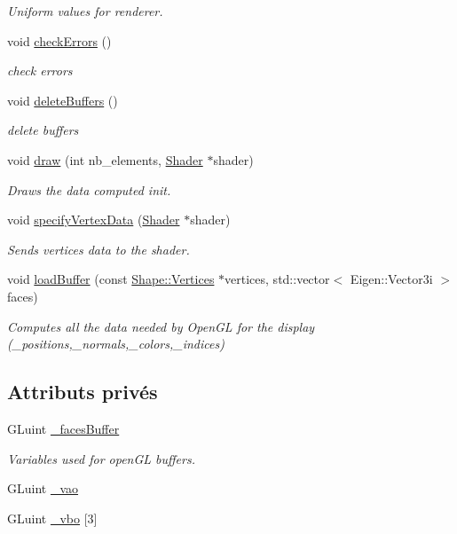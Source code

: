 \begin{DoxyCompactItemize}
\begin{DoxyCompactList}\small\item\em Uniform values for renderer. \end{DoxyCompactList}\item 
void \hyperlink{class_rendering___open_g_l_a9621079239b6b621dfc8f9c4e93bdd7a}{check\+Errors} ()
\begin{DoxyCompactList}\small\item\em check errors \end{DoxyCompactList}\item 
void \hyperlink{class_rendering___open_g_l_aab5b195bb52751243f4944417f9ae7d5}{delete\+Buffers} ()
\begin{DoxyCompactList}\small\item\em delete buffers \end{DoxyCompactList}\item 
void \hyperlink{class_rendering___open_g_l_a94abb636d4264637628e4b9b97c087d2}{draw} (int nb\+\_\+elements, \hyperlink{class_shader}{Shader} $\ast$shader)
\begin{DoxyCompactList}\small\item\em Draws the data computed init. \end{DoxyCompactList}\item 
void \hyperlink{class_rendering___open_g_l_a8ad1a3e698d694782f4174d94b745cd5}{specify\+Vertex\+Data} (\hyperlink{class_shader}{Shader} $\ast$shader)
\begin{DoxyCompactList}\small\item\em Sends vertices data to the shader. \end{DoxyCompactList}\item 
void \hyperlink{class_rendering___open_g_l_aee7a6085edb4e6927282067b6cde59bf}{load\+Buffer} (const \hyperlink{struct_shape_1_1_vertices}{Shape\+::\+Vertices} $\ast$vertices, std\+::vector$<$ Eigen\+::\+Vector3i $>$ faces)
\begin{DoxyCompactList}\small\item\em Computes all the data needed by Open\+GL for the display (\+\_\+positions,\+\_\+normals,\+\_\+colors,\+\_\+indices) \end{DoxyCompactList}\end{DoxyCompactItemize}
\subsection*{Attributs privés}
\begin{DoxyCompactItemize}
\item 
G\+Luint \hyperlink{class_rendering___open_g_l_a6838049f26cc1811531f2e266f61c158}{\+\_\+faces\+Buffer}
\begin{DoxyCompactList}\small\item\em Variables used for open\+GL buffers. \end{DoxyCompactList}\item 
G\+Luint \hyperlink{class_rendering___open_g_l_a4397283457770370db833b1c59db797e}{\+\_\+vao}
\item 
G\+Luint \hyperlink{class_rendering___open_g_l_ade7eb98ac80d30c4611389027a2ed568}{\+\_\+vbo} \mbox{[}3\mbox{]}
\end{DoxyCompactItemize}


